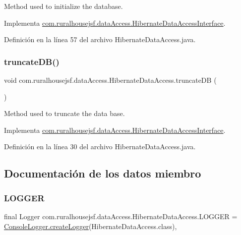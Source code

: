 Method used to initialize the database. 



Implementa \mbox{\hyperlink{a00148_acab426a4933f3510c317816c136cec0b}{com.\+ruralhousejsf.\+data\+Access.\+Hibernate\+Data\+Access\+Interface}}.



Definición en la línea 57 del archivo Hibernate\+Data\+Access.\+java.

\mbox{\label{a00144_a81a5e60db58acfc1a3c1de2f014813d5}} 
\subsubsection{\texorpdfstring{truncateDB()}{truncateDB()}}
{\footnotesize\ttfamily void com.\+ruralhousejsf.\+data\+Access.\+Hibernate\+Data\+Access.\+truncate\+DB (\begin{DoxyParamCaption}{ }\end{DoxyParamCaption})}



Method used to truncate the data base. 



Implementa \mbox{\hyperlink{a00148_a181eb91e600e57fe36301128022f535d}{com.\+ruralhousejsf.\+data\+Access.\+Hibernate\+Data\+Access\+Interface}}.



Definición en la línea 30 del archivo Hibernate\+Data\+Access.\+java.



\subsection{Documentación de los datos miembro}
\mbox{\label{a00144_a3f050c37956274b82491f5fcf9ce5db1}} 
\subsubsection{\texorpdfstring{LOGGER}{LOGGER}}
{\footnotesize\ttfamily final Logger com.\+ruralhousejsf.\+data\+Access.\+Hibernate\+Data\+Access.\+L\+O\+G\+G\+ER = \mbox{\hyperlink{a00220_a520321643663e37d95761134a35505cd}{Console\+Logger.\+create\+Logger}}(Hibernate\+Data\+Access.\+class)\hspace{0.3cm}{\ttfamily [static]}, {\ttfamily [private]}}



